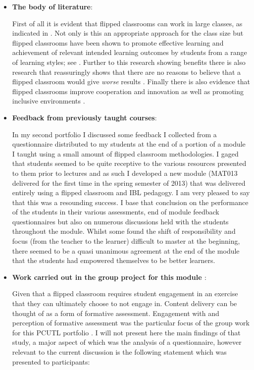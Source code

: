 \documentclass{article}
\begin{document}
\begin{itemize}
\item \textbf{The body of literature}:

First of all it is evident that flipped classrooms can work in large classes, as indicated in \cite{bates_inverted_2012, deslauriers_improved_2011, gannod_using_2008, moravec_learn_2010}. Not only is this an appropriate approach for the class size but flipped classrooms have been shown to promote effective learning and achievement of relevant intended learning outcomes by students from a range of learning styles; see \cite{bartlett_flip_1995, bates_inverted_2012, deslauriers_improved_2011, moravec_learn_2010, noora_review_2013, pinder-grover_efficacy_2011}. Further to this research showing benefits there is also research that reassuringly shows that there are no reasons to believe that a flipped classroom would give \textit{worse} results \cite{frederickson_evaluating_2005}. Finally there is also evidence that flipped classrooms improve cooperation and innovation \cite{strayer_how_2012} as well as promoting inclusive environments \cite{lage_inverting_2000}.

\item \textbf{Feedback from previously taught courses}:

In my second portfolio I discussed some feedback I collected from a questionnaire distributed to my students at the end of a portion of a module I taught using a small amount of flipped classroom methodologies. I gaged that students seemed to be quite receptive to the various resources presented to them prior to lectures and as such I developed a new module (MAT013 delivered for the first time in the spring semester of 2013) that was delivered entirely using a flipped classroom and IBL pedagogy. I am very pleased to say that this was a resounding success. I base that conclusion on the performance of the students in their various assessments, end of module feedback questionnaires but also on numerous discussions held with the students throughout the module. Whilst some found the shift of responsibility and focus (from the teacher to the learner) difficult to master at the beginning, there seemed to be a quasi unanimous agreement at the end of the module that the students had empowered themselves to be better learners.

\item \textbf{Work carried out in the group project for this module \cite{anderson_understanding_2013}}:

Given that a flipped classroom requires student engagement in an exercise that they can ultimately choose to not engage in. Content delivery can be thought of as a form of formative assessment. Engagement with and perception of formative assessment was the particular focus of the group work for this PCUTL portfolio \cite{anderson_understanding_2013}. I will not present here the main findings of that study, a major aspect of which was the analysis of a questionnaire, however relevant to the current discussion is the following statement which was presented to participants:


\end{itemize}
\end{document}
